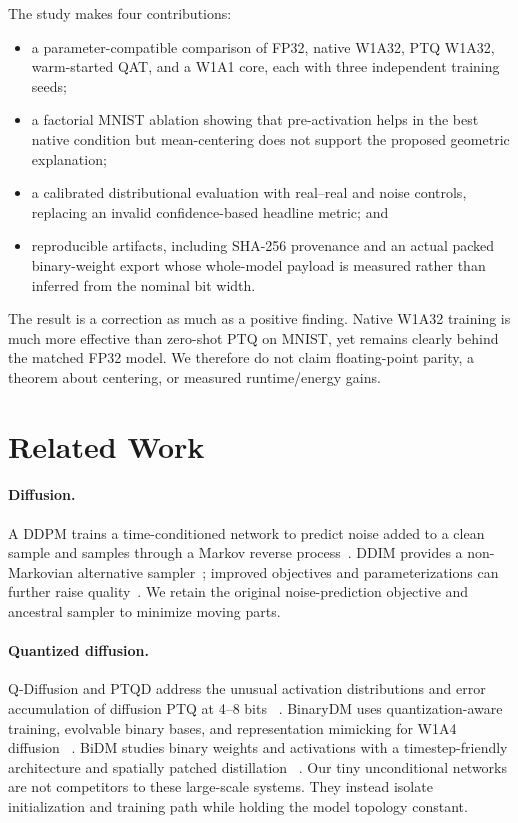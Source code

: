 \documentclass[conference]{IEEEtran}
\begin{document}
The study makes four contributions:
\begin{itemize}
  \item a parameter-compatible comparison of FP32, native W1A32, PTQ W1A32,
  warm-started QAT, and a W1A1 core, each with three independent training seeds;
  \item a factorial MNIST ablation showing that pre-activation helps in the best
  native condition but mean-centering does not support the proposed geometric
  explanation;
  \item a calibrated distributional evaluation with real--real and noise controls,
  replacing an invalid confidence-based headline metric; and
  \item reproducible artifacts, including SHA-256 provenance and an actual packed
  binary-weight export whose whole-model payload is measured rather than inferred
  from the nominal bit width.
\end{itemize}

The result is a correction as much as a positive finding. Native W1A32 training
is much more effective than zero-shot PTQ on MNIST, yet remains clearly behind the
matched FP32 model. We therefore do not claim floating-point parity, a theorem
about centering, or measured runtime/energy gains.

\section{Related Work}

\paragraph{Diffusion.}
A DDPM trains a time-conditioned network to predict noise added to a clean sample
and samples through a Markov reverse process~\cite{ho2020ddpm}. DDIM provides a
non-Markovian alternative sampler~\cite{song2020ddim}; improved objectives and
parameterizations can further raise quality~\cite{nichol2021improved}. We retain
the original noise-prediction objective and ancestral sampler to minimize moving
parts.

\paragraph{Quantized diffusion.}
Q-Diffusion and PTQD address the unusual activation distributions and error
accumulation of diffusion PTQ at 4--8 bits
~\cite{li2023qdiffusion,he2023ptqd}. BinaryDM uses quantization-aware training,
evolvable binary bases, and representation mimicking for W1A4 diffusion
~\cite{binarydm2025}. BiDM studies binary weights and activations with a
timestep-friendly architecture and spatially patched distillation
~\cite{bidm2024}. Our tiny unconditional networks are not competitors to these
large-scale systems. They instead isolate initialization and training path while
holding the model topology constant.
\end{document}

